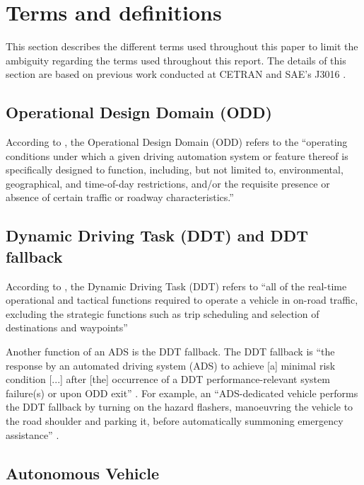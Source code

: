 \section{Terms and definitions}
\label{sec:definitions}

This section describes the different terms used throughout this paper to limit the ambiguity regarding the terms used throughout this report. The details of this section are based on previous work conducted at CETRAN \cite{degelder2018ontology} and SAE's J3016 \cite{sae2018j3016}.



\subsection{Operational Design Domain (ODD)}

According to \cite{sae2018j3016}, the Operational Design Domain (ODD) refers to the ``operating conditions under which a given driving automation system or feature thereof is specifically designed to function, including, but not limited to, environmental, geographical, and time-of-day restrictions, and/or the requisite presence or absence of certain traffic or roadway characteristics.''



\subsection{Dynamic Driving Task (DDT) and DDT fallback}

According to \cite{sae2018j3016}, the Dynamic Driving Task (DDT) refers to ``all of the real-time operational and tactical functions required to operate a vehicle in on-road traffic, excluding the strategic functions such as trip scheduling and selection of destinations and waypoints''
	
Another function of an ADS is the DDT fallback. The DDT fallback is ``the response by an automated driving system (ADS) to achieve [a] minimal risk condition [...] after [the] occurrence of a DDT performance-relevant system failure(s) or upon ODD exit'' \cite{sae2018j3016}. For example, an ``ADS-dedicated vehicle performs the DDT fallback by turning on the hazard flashers, manoeuvring the vehicle to the road shoulder and parking it, before automatically summoning emergency assistance'' \cite{sae2018j3016}.



\subsection{Autonomous Vehicle} 

